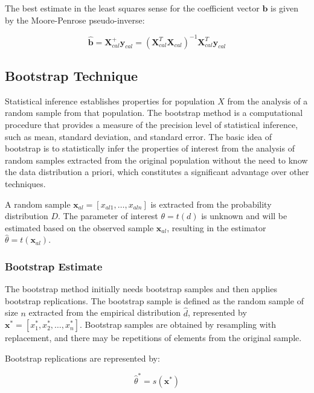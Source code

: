 \documentclass[12pt]{article}
\begin{document}
The best estimate in the least squares sense for the coefficient vector $\mathbf{b}$ is given by the Moore-Penrose pseudo-inverse:\cite{Lawson:1974}

\begin{equation}
\hat{\mathbf{b}} = \mathbf{X}^+_{cal}\mathbf{y}_{cal} = (\mathbf{X}^T_{cal}\mathbf{X}_{cal})^{-1}\mathbf{X}^T_{cal}\mathbf{y}_{cal}
\end{equation}

\subsection{Bootstrap Technique}

Statistical inference establishes properties for population $X$ from the analysis of a random sample from that population.\cite{Draper:1998,Johnson:2001,Chatterjee:2006} The bootstrap method is a computational procedure that provides a measure of the precision level of statistical inference, such as mean, standard deviation, and standard error.\cite{Kupper:1998,Stephan:2005} The basic idea of bootstrap is to statistically infer the properties of interest from the analysis of random samples extracted from the original population without the need to know the data distribution a priori, which constitutes a significant advantage over other techniques.

A random sample $\mathbf{x}_{al} = [x_{al1}, \ldots, x_{aln}]$ is extracted from the probability distribution $D$. The parameter of interest $\theta = t(d)$ is unknown and will be estimated based on the observed sample $\mathbf{x}_{al}$, resulting in the estimator $\hat{\theta} = t(\mathbf{x}_{al})$.

\subsubsection{Bootstrap Estimate}

The bootstrap method initially needs bootstrap samples and then applies bootstrap replications. The bootstrap sample is defined as the random sample of size $n$ extracted from the empirical distribution $\hat{d}$, represented by $\mathbf{x}^* = [x^*_1, x^*_2, \ldots, x^*_n]$.\cite{Efron:1994} Bootstrap samples are obtained by resampling with replacement, and there may be repetitions of elements from the original sample.

Bootstrap replications are represented by:

\begin{equation}
\hat{\theta}^* = s(\mathbf{x}^*)
\end{equation}
\end{document}
